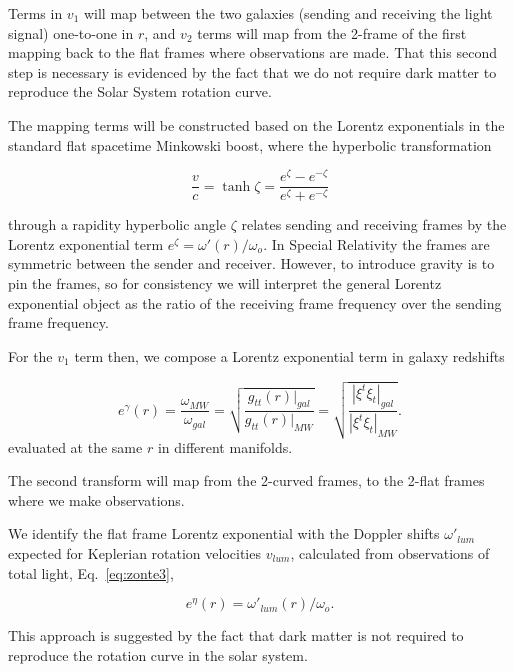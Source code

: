 \documentclass[reprint,%
 amsmath,amssymb,
 aps,
]{revtex4-1}
\begin{document}
 
Terms in $v_1$   will  map between the two galaxies (sending and receiving the light signal) one-to-one in $r$, and $v_2$ terms will map from the 2-frame of the first mapping back to the flat frames where observations are made. That this second step is necessary is evidenced by the fact that we do not require dark matter to reproduce the Solar System rotation curve.  

 The mapping terms will be constructed based on the 
 Lorentz exponentials in the   standard flat spacetime  Minkowski boost, 
 where   the  hyperbolic  transformation  

     \begin{equation}
         \frac{v}{c} = \tanh \zeta = \frac{e^\zeta - e^{-\zeta}}{e^\zeta + e^{-\zeta}}   
         \label{boost}
     \end{equation} 

 through a rapidity hyperbolic angle $\zeta$ relates sending and receiving frames by  the
    Lorentz exponential term  $e^\zeta = \omega'(r) /\omega_o$. In Special Relativity the frames are   symmetric between the sender and receiver. However, to introduce gravity is to pin the frames, so for consistency we will interpret the general Lorentz exponential object as the ratio of the receiving frame frequency over the   sending frame frequency.  
 
For the $v_1$ term then, we compose a   Lorentz exponential term  in galaxy redshifts
 
     \begin{equation}
     e^{\gamma}(r)=  \frac{\omega_{MW}}{\omega_{gal}}  =\sqrt{\frac{g_{tt}(r)|_{gal}}{g_{tt}(r)|_{MW}}} =\sqrt{\frac{|\xi^t\xi_{t}|_{gal}}{|\xi^t\xi_{t}|_{MW}}}. 
      \label{eq:gravRS}
    \end{equation}
 evaluated at the same $r$ in different manifolds. 
   
 
The  second transform will map  from the 2-curved frames, to the 2-flat frames  where we make observations.

We identify the flat frame Lorentz exponential with the Doppler shifts $\omega'_{lum}$ expected for      Keplerian rotation velocities $v_{lum}$,   calculated from  observations of total light, Eq.~\ref{eq:zonte3},

\begin{equation}
    e^{\eta}(r)=\omega'_{lum}(r)/\omega_o.  
    \label{eq:flat}
  \end{equation} 
  
 This approach is suggested by   the fact that dark matter is not required to reproduce the rotation curve in the  solar system.  
\end{document}
